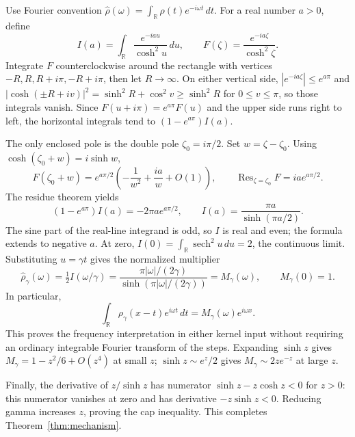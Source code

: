 \documentclass[11pt]{article}
\DeclareMathOperator{\sech}{sech}
\DeclareMathOperator{\Res}{Res}
\theoremstyle{definition}
\begin{document}
Use Fourier convention
$\widehat\rho(\omega)=\int_{\mathbb R}\rho(t)e^{-i\omega t}\,dt$.
For a real number $a>0$, define
\begin{equation}
 I(a)=\int_{\mathbb R}\frac{e^{-iau}}{\cosh^2u}\,du,
 \qquad F(\zeta)=\frac{e^{-ia\zeta}}{\cosh^2\zeta}.
\end{equation}
Integrate $F$ counterclockwise around the rectangle with vertices
$-R,R,R+i\pi,-R+i\pi$, then let $R\to\infty$. On either vertical side,
$|e^{-ia\zeta}|\le e^{a\pi}$ and
$|\cosh(\pm R+iv)|^2=\sinh^2R+\cos^2v\ge\sinh^2R$
for $0\le v\le\pi$, so those integrals vanish. Since
$F(u+i\pi)=e^{a\pi}F(u)$ and the upper side runs right to left, the
horizontal integrals tend to $(1-e^{a\pi})I(a)$.

The only enclosed pole is the double pole $\zeta_0=i\pi/2$. Set
$w=\zeta-\zeta_0$. Using $\cosh(\zeta_0+w)=i\sinh w$,
\begin{equation}
 F(\zeta_0+w)=e^{a\pi/2}\left(-\frac1{w^2}+\frac{ia}{w}+O(1)\right),
 \qquad \Res_{\zeta=\zeta_0}F=ia e^{a\pi/2}.
\end{equation}
The residue theorem yields
\begin{equation}
 (1-e^{a\pi})I(a)=-2\pi a e^{a\pi/2},
 \qquad I(a)=\frac{\pi a}{\sinh(\pi a/2)}.
\end{equation}
The sine part of the real-line integrand is odd, so $I$ is real and even;
the formula extends to negative $a$. At zero,
$I(0)=\int_{\mathbb R}\sech^2u\,du=2$, the continuous limit.
Substituting $u=\gamma t$ gives the normalized multiplier
\begin{equation}
 \widehat\rho_\gamma(\omega)=\tfrac12 I(\omega/\gamma)
 =\frac{\pi|\omega|/(2\gamma)}{\sinh(\pi|\omega|/(2\gamma))}
 =M_\gamma(\omega),\qquad M_\gamma(0)=1.
\end{equation}
In particular,
\begin{equation}
 \int_{\mathbb R}\rho_\gamma(x-t)e^{i\omega t}\,dt
 =M_\gamma(\omega)e^{i\omega x}.
\end{equation}
This proves the frequency interpretation in either kernel input without
requiring an ordinary integrable Fourier transform of the steps.
Expanding $\sinh z$ gives $M_\gamma=1-z^2/6+O(z^4)$ at small $z$;
$\sinh z\sim e^z/2$ gives $M_\gamma\sim2ze^{-z}$ at large $z$.

Finally, the derivative of $z/\sinh z$ has numerator
$\sinh z-z\cosh z<0$ for $z>0$: this numerator vanishes at zero and has
derivative $-z\sinh z<0$. Reducing gamma increases $z$, proving the cap
inequality. This completes Theorem~\ref{thm:mechanism}.
\end{document}
